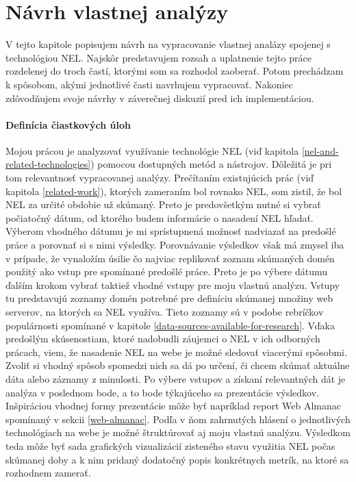 \chapter{Návrh vlastnej analýzy}
\label{possible-analysis-strategies}


V tejto kapitole popisujem návrh na vypracovanie vlastnej analázy spojenej s technológiou NEL.
Najskôr predstavujem rozsah a uplatnenie tejto práce rozdelenej do troch častí, ktorými som sa rozhodol zaoberať.
Potom prechádzam k spôsobom, akými jednotlivé časti navrhujem vypracovať.
Nakoniec zdôvodňujem svoje návrhy v záverečnej diskuzií pred ich implementáciou.

\subsubsection{Definícia čiastkových úloh}

Mojou prácou je analyzovať využívanie technológie NEL (viď kapitola \ref{nel-and-related-technologies}) pomocou dostupných metód a nástrojov.
Dôležitá je pri tom relevantnosť vypracovanej analýzy.
Prečítaním existujúcich prác (viď kapitola \ref{related-work}), ktorých zameraním bol rovnako NEL, som zistil, že bol NEL za určité obdobie už skúmaný.
Preto je predovšetkým nutné si vybrať počiatočný dátum, od ktorého budem informácie o nasadení NEL hľadať. 
Výberom vhodného dátumu je mi sprístupnená možnosť nadviazať na predošlé práce a porovnať si s nimi výsledky.
Porovnávanie výsledkov však má zmysel iba v prípade, že vynaložím úsilie čo najviac replikovať zoznam skúmaných domén použitý ako vstup pre spomínané predošlé práce.
Preto je po výbere dátumu ďalším krokom vybrať taktiež vhodné vstupy pre moju vlastnú analýzu.
Vstupy tu predstavujú zoznamy domén potrebné pre definíciu skúmanej množiny web serverov, na ktorých sa NEL využíva.
Tieto zoznamy sú v podobe rebríčkov populárnosti spomínané v kapitole \ref{data-sources-available-for-research}.
Vďaka predošlým skúsenostiam, ktoré nadobudli záujemci o NEL v ich odborných prácach, viem, že nasadenie NEL na webe je možné sledovať viacerými spôsobmi.
Zvoliť si vhodný spôsob spomedzi nich sa dá po určení, či chcem skúmať aktuálne dáta alebo záznamy z minulosti.
Po výbere vstupov a získaní relevantných dát je analýza v poslednom bode, a to bode týkajúceho sa prezentácie výsledkov.
Inšpiráciou vhodnej formy prezentácie môže byť napríklad report Web Almanac spomínaný v sekcii \ref{web-almanac}.
Podľa v ňom zahrnutých hlásení o jednotlivých technológiach na webe je možné štruktúrovať aj moju vlastnú analýzu.
Výsledkom teda môže byť sada grafických vizualizácií zisteného stavu využitia NEL počas skúmanej doby a k nim pridaný dodatočný popis konkrétnych metrík, na ktoré sa rozhodnem zamerať.

